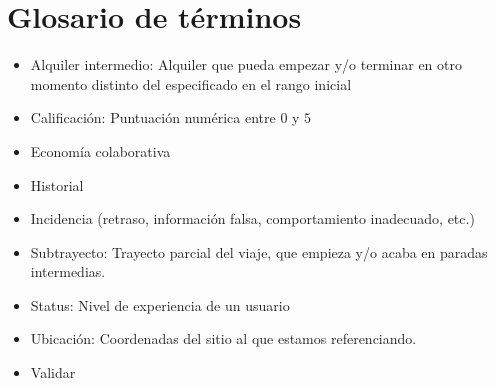 \documentclass[11pt,spanish]{article} %
\begin{document}
\section{Glosario de términos}
\begin{itemize}
	\item Alquiler intermedio: Alquiler que pueda empezar y/o terminar en otro momento distinto del especificado en el rango inicial
	\item Calificación: Puntuación numérica entre $0$ y $5$
	\item Economía colaborativa
	\item Historial
	\item Incidencia (retraso, información falsa, comportamiento inadecuado, etc.)
	\item Subtrayecto: Trayecto parcial del viaje, que empieza y/o acaba en paradas intermedias.
	\item Status: Nivel de experiencia de un usuario
	\item Ubicación: Coordenadas del sitio al que estamos referenciando.
	\item Validar	
\end{itemize}







  

  
\end{document}
